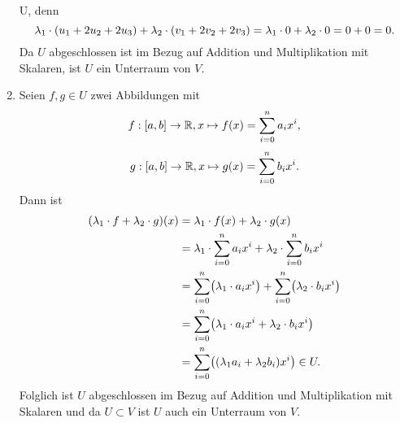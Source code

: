 \documentclass[german,12pt]{homework}
\newcommand{\RR}{\mathbb{R}}
\DeclarePairedDelimiter{\enbrace}{(}{)}
\DeclarePairedDelimiter{\benbrace}{[}{]}
\begin{document}
\begin{enumerate}
        \in U\), denn
        \[\lambda_1 \cdot \enbrace*{u_1 + 2u_2 + 2u_3} + \lambda_2 \cdot
        \enbrace*{v_1 + 2v_2 + 2v_3} = \lambda_1 \cdot 0 + \lambda_2 \cdot 0 =
        0 + 0 = 0.\]
        Da \(U\) abgeschlossen ist im Bezug auf Addition und Multiplikation mit
        Skalaren, ist \(U\) ein Unterraum von \(V\).
        \item Seien \(f,g \in U\) zwei Abbildungen mit
        \[f: \benbrace*{a, b} \to \RR, x \mapsto f\enbrace*{x} = \sum_{i =
        0}^na_ix^i,\]
        \[g: \benbrace*{a, b} \to \RR, x \mapsto g\enbrace*{x} = \sum_{i =
        0}^nb_ix^i.\]
        Dann ist
        \begin{align*}
            \enbrace*{\lambda_1 \cdot f + \lambda_2 \cdot g}\enbrace*{x} &=
            \lambda_1 \cdot f\enbrace*{x} + \lambda_2 \cdot g\enbrace*{x}\\
            &= \lambda_1 \cdot \sum_{i = 0}^na_ix^i + \lambda_2 \cdot \sum_{i =
            0}^nb_ix^i\\
            &= \sum_{i = 0}^n\enbrace*{\lambda_1 \cdot a_ix^i} + \sum_{i =
            0}^n\enbrace*{\lambda_2 \cdot b_ix^i}\\
            &= \sum_{i = 0}^n\enbrace*{\lambda_1 \cdot a_ix^i + \lambda_2 \cdot
            b_ix^i}\\
            &= \sum_{i = 0}^n\enbrace*{\enbrace*{\lambda_1a_i +
            \lambda_2b_i}x^i} \in U.
        \end{align*}
        Folglich ist \(U\) abgeschlossen im Bezug auf Addition und
        Multiplikation mit Skalaren und da \(U \subset V\) ist \(U\) auch ein
        Unterraum von \(V\).
    \end{enumerate}
\end{document}
